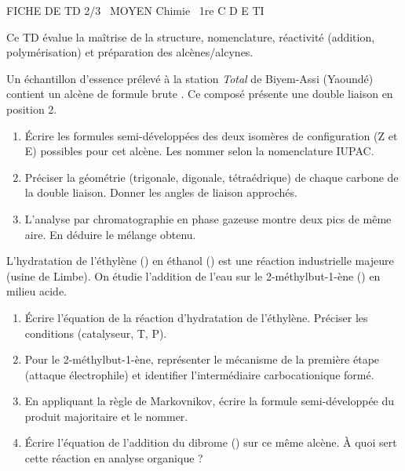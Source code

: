 \documentclass[11pt]{article}
\begin{document}
\begin{tcolorbox}[enhanced,colback=popink,colframe=popink,arc=10pt,boxrule=0pt,left=12pt,right=12pt,top=9pt,bottom=9pt]
{\color{white}\popxbold\small FICHE DE TD 2/3 \textbullet\ MOYEN \hfill Chimie \textbullet\ 1re C D E TI\par}
\end{tcolorbox}
\vspace{4pt}
Ce TD évalue la maîtrise de la structure, nomenclature, réactivité (addition, polymérisation) et préparation des alcènes/alcynes.

\begin{exercice}
Un échantillon d'essence prélevé à la station \textit{Total} de Biyem-Assi (Yaoundé) contient un alcène de formule brute . Ce composé présente une double liaison en position 2.
\begin{enumerate}
    \item Écrire les formules semi-développées des deux isomères de configuration (Z et E) possibles pour cet alcène. Les nommer selon la nomenclature IUPAC.
    \item Préciser la géométrie (trigonale, digonale, tétraédrique) de chaque carbone de la double liaison. Donner les angles de liaison approchés.
    \item L'analyse par chromatographie en phase gazeuse montre deux pics de même aire. En déduire le mélange obtenu.
\end{enumerate}
\end{exercice}

\begin{exercice}
L'hydratation de l'éthylène () en éthanol () est une réaction industrielle majeure (usine de Limbe). On étudie l'addition de l'eau sur le 2-méthylbut-1-ène () en milieu acide.
\begin{enumerate}
    \item Écrire l'équation de la réaction d'hydratation de l'éthylène. Préciser les conditions (catalyseur, T, P).
    \item Pour le 2-méthylbut-1-ène, représenter le mécanisme de la première étape (attaque électrophile) et identifier l'intermédiaire carbocationique formé.
    \item En appliquant la règle de Markovnikov, écrire la formule semi-développée du produit majoritaire et le nommer.
    \item Écrire l'équation de l'addition du dibrome () sur ce même alcène. À quoi sert cette réaction en analyse organique ?
\end{enumerate}
\end{exercice}
\end{document}
